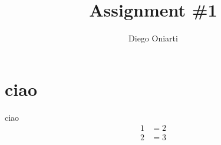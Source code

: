 \documentclass{article}
\title{Assignment \#1}
\author{Diego Oniarti}
\begin{document}
\maketitle

\section{ciao}
ciao
\begin{align*}
    1 &= 2 \\
    2 &= 3
\end{align*}
\end{document}
